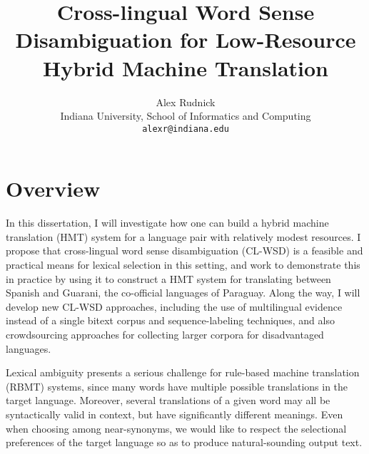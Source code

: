 \documentclass{article}
\title{Cross-lingual Word Sense Disambiguation for Low-Resource Hybrid Machine
Translation}
\author{Alex Rudnick \\
	    Indiana University, School of Informatics and Computing \\
	    {\tt alexr@indiana.edu}}
\date{}
\begin{document}
\maketitle



\section{Overview}


In this dissertation, I will investigate how one can build a hybrid machine
translation (HMT) system for a language pair with relatively modest resources.
I propose that cross-lingual word sense disambiguation (CL-WSD) is a
feasible and practical means for lexical selection in this setting, and work to
demonstrate this in practice by using it to construct a HMT system for
translating between Spanish and Guarani, the co-official languages of Paraguay.
Along the way, I will develop new CL-WSD approaches, including the use of
multilingual evidence instead of a single bitext corpus and sequence-labeling
techniques, and also crowdsourcing approaches for collecting larger corpora for
disadvantaged languages.

Lexical ambiguity presents a serious challenge for rule-based machine
translation (RBMT) systems, since many words have multiple possible
translations in the target language. Moreover, several translations of a given
word may all be syntactically valid in context, but have significantly
different meanings. Even when choosing among near-synonyms, we would like to
respect the selectional preferences of the target language so as to produce
natural-sounding output text.
\end{document}
